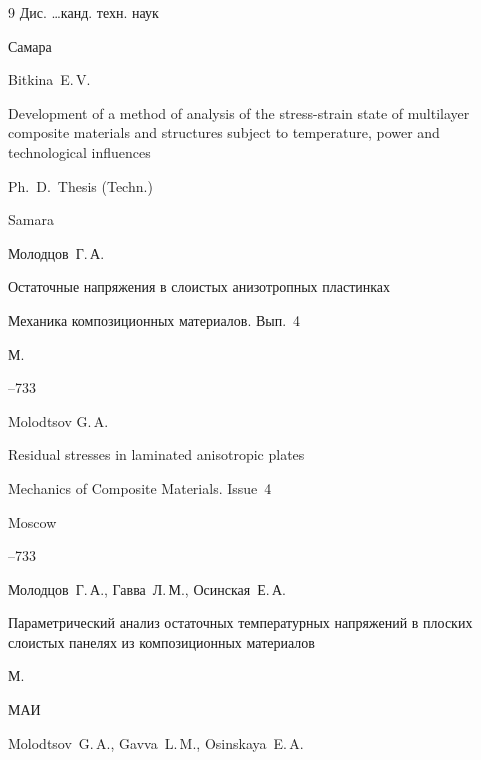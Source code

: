 \begin{thebibliography}{9}
\thesisinfo Дис. \ldots канд. техн. наук

\publaddr Самара



\misctransl

\by Bitkina~E.\,V.

\thesis Development of a method of analysis of the stress-strain state of multilayer composite materials and structures subject to temperature, power and technological influences

\thesisinfo Ph.~D.~Thesis (Techn.)

\publaddr Samara










\by Молодцов~Г.\,А.

\paper Остаточные напряжения в слоистых анизотропных пластинках

\inbook Механика композиционных материалов. \rm Вып.~4

\publaddr М.


--733

\misctransl

\by Molodtsov G.\,A.

\paper Residual stresses in laminated anisotropic plates

\inbook Mechanics of Composite Materials. \rm Issue~4

\publaddr Moscow


--733






\by Молодцов~Г.\,А., Гавва~Л.\,М., Осинская~Е.\,А.

\book Параметрический анализ остаточных температурных напряжений в плоских слоистых панелях из композиционных материалов

\publaddr М.

\publ МАИ



\misctransl 

\by Molodtsov~G.\,A., Gavva~L.\,M., Osinskaya~E.\,A.


\end{thebibliography}
